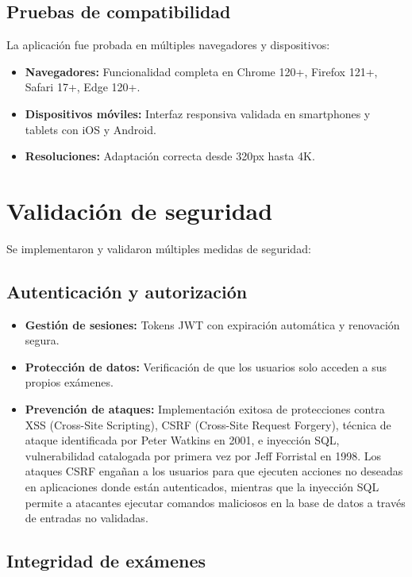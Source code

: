 \documentclass[12pt,a4paper]{report}
\begin{document}
\subsection{Pruebas de compatibilidad}

La aplicación fue probada en múltiples navegadores y dispositivos:

\begin{itemize}
\item \textbf{Navegadores:} Funcionalidad completa en Chrome 120+, Firefox 121+, Safari 17+, Edge 120+.
\item \textbf{Dispositivos móviles:} Interfaz responsiva validada en smartphones y tablets con iOS y Android.
\item \textbf{Resoluciones:} Adaptación correcta desde 320px hasta 4K.
\end{itemize}

\section{Validación de seguridad}

Se implementaron y validaron múltiples medidas de seguridad:

\subsection{Autenticación y autorización}

\begin{itemize}
\item \textbf{Gestión de sesiones:} Tokens JWT con expiración automática y renovación segura.
\item \textbf{Protección de datos:} Verificación de que los usuarios solo acceden a sus propios exámenes.
\item \textbf{Prevención de ataques:} Implementación exitosa de protecciones contra XSS (Cross-Site Scripting), CSRF (Cross-Site Request Forgery), técnica de ataque identificada por Peter Watkins en 2001, e inyección SQL, vulnerabilidad catalogada por primera vez por Jeff Forristal en 1998. Los ataques CSRF engañan a los usuarios para que ejecuten acciones no deseadas en aplicaciones donde están autenticados, mientras que la inyección SQL permite a atacantes ejecutar comandos maliciosos en la base de datos a través de entradas no validadas.
\end{itemize}

\subsection{Integridad de exámenes}
\end{document}

